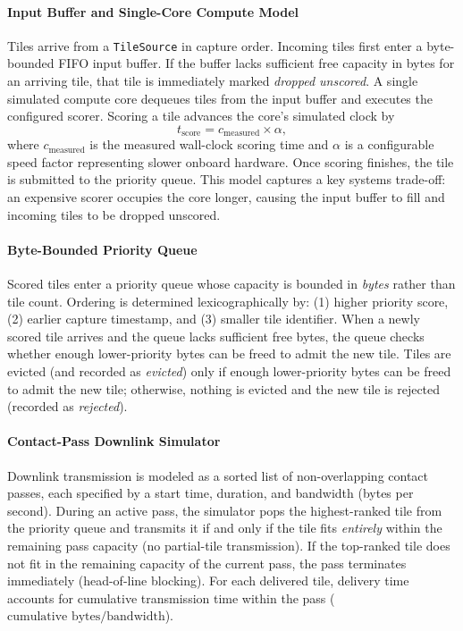\documentclass[conference]{IEEEtran}
\begin{document}
\paragraph{Input Buffer and Single-Core Compute Model}
Tiles arrive from a \texttt{TileSource} in capture order. Incoming tiles first enter a byte-bounded FIFO input buffer. If the buffer lacks sufficient free capacity in bytes for an arriving tile, that tile is immediately marked \emph{dropped unscored}. A single simulated compute core dequeues tiles from the input buffer and executes the configured scorer. Scoring a tile advances the core's simulated clock by
\begin{equation}
    t_{\text{score}} = c_{\text{measured}} \times \alpha,
\end{equation}
where $c_{\text{measured}}$ is the measured wall-clock scoring time and $\alpha$ is a configurable speed factor representing slower onboard hardware. Once scoring finishes, the tile is submitted to the priority queue. This model captures a key systems trade-off: an expensive scorer occupies the core longer, causing the input buffer to fill and incoming tiles to be dropped unscored.

\paragraph{Byte-Bounded Priority Queue}
Scored tiles enter a priority queue whose capacity is bounded in \emph{bytes} rather than tile count. Ordering is determined lexicographically by: (1) higher priority score, (2) earlier capture timestamp, and (3) smaller tile identifier. When a newly scored tile arrives and the queue lacks sufficient free bytes, the queue checks whether enough lower-priority bytes can be freed to admit the new tile. Tiles are evicted (and recorded as \emph{evicted}) only if enough lower-priority bytes can be freed to admit the new tile; otherwise, nothing is evicted and the new tile is rejected (recorded as \emph{rejected}).

\paragraph{Contact-Pass Downlink Simulator}
Downlink transmission is modeled as a sorted list of non-overlapping contact passes, each specified by a start time, duration, and bandwidth (bytes per second). During an active pass, the simulator pops the highest-ranked tile from the priority queue and transmits it if and only if the tile fits \emph{entirely} within the remaining pass capacity (no partial-tile transmission). If the top-ranked tile does not fit in the remaining capacity of the current pass, the pass terminates immediately (head-of-line blocking). For each delivered tile, delivery time accounts for cumulative transmission time within the pass ($\text{cumulative bytes} / \text{bandwidth}$).
\end{document}
